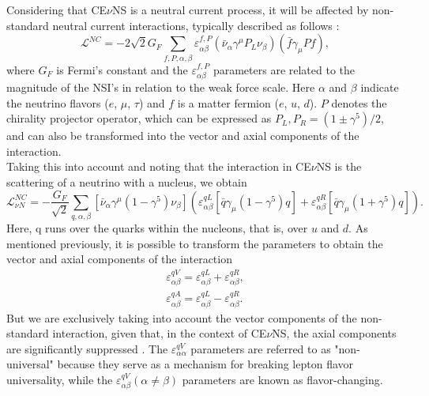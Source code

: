 Considering that CE$\nu$NS is a neutral current process, it will be affected by non-standard neutral current interactions, typically described as follows \cite{Dev_2019}:
\begin{equation}
    \mathcal{L}^{NC}=-2\sqrt{2}G_F \sum_{f,P,\alpha,\beta} \varepsilon_{\alpha \beta}^{f,P} \left(\bar\nu_\alpha\gamma^\mu P_L \nu_\beta\right)\left(\bar f \gamma_\mu P f\right),
\end{equation}
where $G_F$ is Fermi's constant and the $\varepsilon_{\alpha \beta}^{f, P}$ parameters are related to the magnitude of the NSI's in relation to the weak force scale. Here $\alpha$ and $\beta$ indicate the neutrino flavors ($e$, $\mu$, $\tau$) and $f$ is a matter fermion ($e$, $u$, $d$). $P$ denotes the chirality projector operator, which can be expressed as $P_L, P_R = \left(1\pm \gamma^5\right)/2$, and can also be transformed into the vector and axial components of the interaction.\\
Taking this into account and noting that the interaction in CE$\nu$NS is the scattering of a neutrino with a nucleus, we obtain
\begin{equation}
    \mathcal{L}_{\nu N}^{NC} =- \frac{G_F}{\sqrt{2}} \sum_{q,\alpha,\beta} \left[\bar\nu_\alpha \gamma^\mu\left(1-\gamma^5\right)\nu_\beta\right] \left(\varepsilon^{qL}_{\alpha \beta} \left[\bar q \gamma_\mu \left(1-\gamma^5\right)q \right] + \varepsilon^{qR}_{\alpha \beta} \left[\bar q \gamma_\mu \left(1+\gamma^5\right)q\right]\right).
\end{equation}
Here, q runs over the quarks within the nucleons, that is, over $u$ and $d$. As mentioned previously, it is possible to transform the parameters to obtain the vector and axial components of the interaction
\begin{align*}
    \varepsilon_{\alpha \beta}^{qV}=\varepsilon_{\alpha \beta }^{qL}+\varepsilon_{\alpha \beta}^{qR},     \\[1.5em]    
 \varepsilon_{\alpha \beta}^{qA}=\varepsilon_{\alpha \beta }^{qL}-\varepsilon_{\alpha \beta}^{qR}.
\end{align*}
But we are exclusively taking into account the vector components of the non-standard interaction, given that, in the context of CE$\nu$NS, the axial components are significantly suppressed \cite{Barranco_2005}. The $\varepsilon_{\alpha \alpha}^{qV}$  parameters are referred to as "non-universal" because they serve as a mechanism for breaking lepton flavor universality, while the $\varepsilon_{\alpha \beta}^{qV} \left(\alpha \neq \beta\right)$ parameters are known as flavor-changing.


